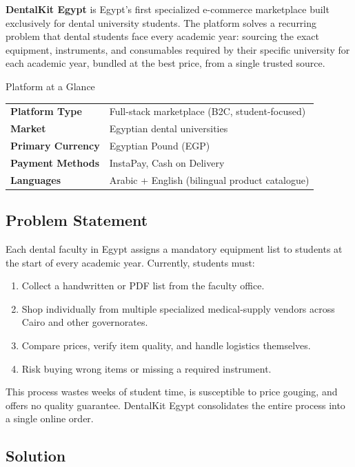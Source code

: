 \documentclass[12pt, a4paper]{article}
\begin{document}
\textbf{DentalKit Egypt} is Egypt's first specialized e-commerce marketplace built exclusively for dental university students. The platform solves a recurring problem that dental students face every academic year: sourcing the exact equipment, instruments, and consumables required by their specific university for each academic year, bundled at the best price, from a single trusted source.

\begin{infobox}{Platform at a Glance}
\begin{tabular}{@{}ll@{}}
\textbf{Platform Type}    & Full-stack marketplace (B2C, student-focused) \\
\textbf{Market}           & Egyptian dental universities \\
\textbf{Primary Currency} & Egyptian Pound (EGP) \\
\textbf{Payment Methods}  & InstaPay, Cash on Delivery \\
\textbf{Languages}        & Arabic + English (bilingual product catalogue) \\
\end{tabular}
\end{infobox}

\subsection{Problem Statement}

Each dental faculty in Egypt assigns a mandatory equipment list to students at the start of every academic year. Currently, students must:

\begin{enumerate}[leftmargin=*]
  \item Collect a handwritten or PDF list from the faculty office.
  \item Shop individually from multiple specialized medical-supply vendors across Cairo and other governorates.
  \item Compare prices, verify item quality, and handle logistics themselves.
  \item Risk buying wrong items or missing a required instrument.
\end{enumerate}

This process wastes weeks of student time, is susceptible to price gouging, and offers no quality guarantee. DentalKit Egypt consolidates the entire process into a single online order.

\subsection{Solution}
\end{document}
